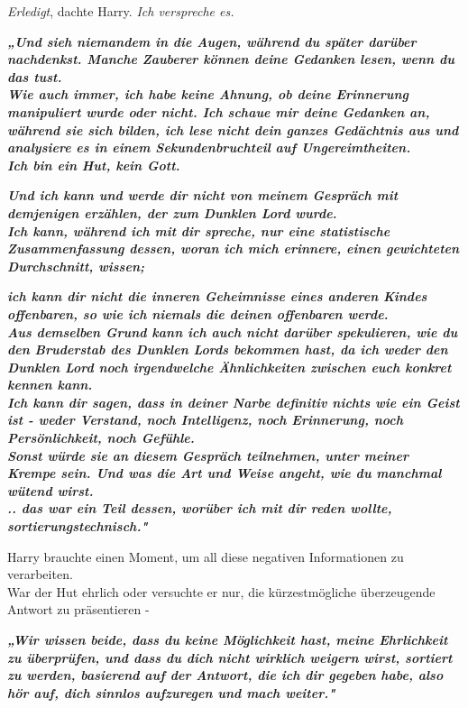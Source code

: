 {\emph{Erledigt}, dachte Harry. \emph{Ich verspreche es.}

\textbf{\emph{„Und sieh niemandem in die Augen, während du später darüber nachdenkst. Manche Zauberer können deine Gedanken lesen, wenn du das tust.\\ Wie auch immer, ich habe keine Ahnung, ob deine Erinnerung manipuliert wurde oder nicht. Ich schaue mir deine Gedanken an, während sie sich bilden, ich lese nicht dein ganzes Gedächtnis aus und analysiere es in einem Sekundenbruchteil auf Ungereimtheiten.}}\\ \textbf{\emph{\hfill\break Ich bin ein Hut, kein Gott.}}

\textbf{\emph{Und ich kann und werde dir nicht von meinem Gespräch mit demjenigen erzählen, der zum Dunklen Lord wurde.\\ Ich kann, während ich mit dir spreche, nur eine statistische Zusammenfassung dessen, woran ich mich erinnere, einen gewichteten Durchschnitt, wissen;}}

\textbf{\emph{ich kann dir nicht die inneren Geheimnisse eines anderen Kindes offenbaren, so wie ich niemals die deinen offenbaren werde.}}\\ \textbf{\emph{\hfill\break Aus demselben Grund kann ich auch nicht darüber spekulieren, wie du den Bruderstab des Dunklen Lords bekommen hast, da ich weder den Dunklen Lord noch irgendwelche Ähnlichkeiten zwischen euch konkret kennen kann.\\ Ich kann dir sagen, dass in deiner Narbe definitiv nichts wie ein Geist ist - weder Verstand, noch Intelligenz, noch Erinnerung, noch Persönlichkeit, noch Gefühle.\\ Sonst würde sie an diesem Gespräch teilnehmen, unter meiner Krempe sein. Und was die Art und Weise angeht, wie du manchmal wütend wirst.\\ .. das war ein Teil dessen, worüber ich mit dir reden wollte, sortierungstechnisch."}}

Harry brauchte einen Moment, um all diese negativen Informationen zu verarbeiten.\\ War der Hut ehrlich oder versuchte er nur, die kürzestmögliche überzeugende Antwort zu präsentieren -

\textbf{\emph{„Wir wissen beide, dass du keine Möglichkeit hast, meine Ehrlichkeit zu überprüfen, und dass du dich nicht wirklich weigern wirst, sortiert zu werden, basierend auf der Antwort, die ich dir gegeben habe, also hör auf, dich sinnlos aufzuregen und mach weiter."}}

}

